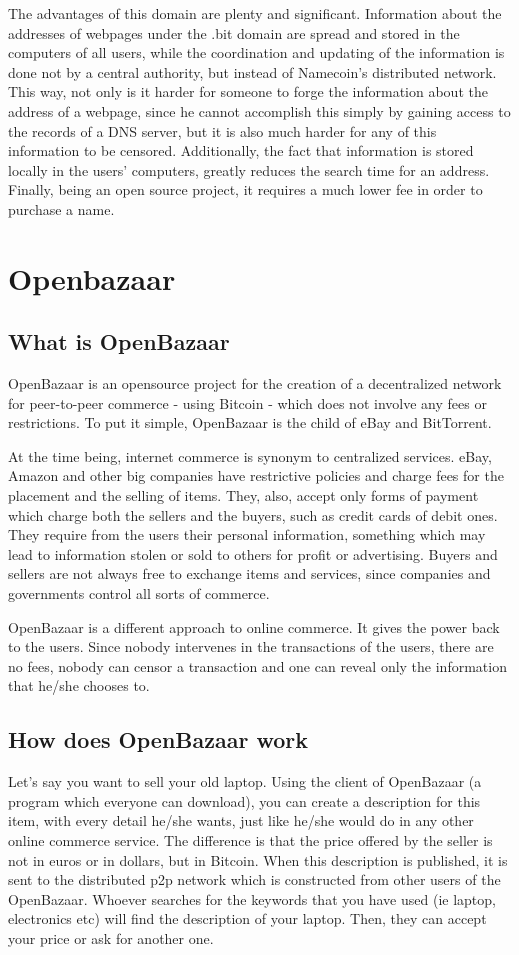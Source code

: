 \documentclass[journal]{IEEEtran}
\begin{document}
The advantages of this domain are plenty and significant. Information about the addresses of
webpages under the .bit domain are spread and stored in the computers of all users,
while the coordination and updating of the information is done not by a central authority,
but instead of Namecoin's distributed network. This way, not only is it harder for someone
to forge the information about the address of a webpage, since he cannot accomplish this
simply by gaining access to the records of a DNS server, but it is also much harder 
for any of this information to be censored. Additionally, the fact that information is
stored locally in the users' computers, greatly reduces the search time for an address.
Finally, being an open source project, it requires a much lower fee in order to purchase
a name.

\section{Openbazaar}
\subsection{What is OpenBazaar}
OpenBazaar is an opensource project for the creation of a decentralized network for peer-to-peer commerce - using Bitcoin - which does not involve any fees or restrictions. To put it simple, OpenBazaar is the child of eBay and BitTorrent. 

At the time being, internet commerce is synonym to centralized services. eBay, Amazon and other big companies have restrictive policies and charge fees for the placement and the selling of items. They, also, accept only forms of payment which charge both the sellers and the buyers, such as credit cards of debit ones. They require from the users their personal information, something which may lead to information stolen or sold to others for profit or advertising. Buyers and sellers are not always free to exchange items and services, since companies and governments control all sorts of commerce.

OpenBazaar is a different approach to online commerce. It gives the power back to the users. Since nobody intervenes in the transactions of the users, there are no fees, nobody can censor a transaction and one can reveal only the information that he/she chooses to.


\subsection{How does OpenBazaar work}
Let's say you want to sell your old laptop. Using the client of OpenBazaar (a program which everyone can download), you can create a description for this item, with every detail he/she wants, just like he/she would do in any other online commerce service. The difference is that the price offered by the seller is not in euros or in dollars, but in Bitcoin. When this description is published, it is sent to the distributed p2p network which is constructed from other users of the OpenBazaar. Whoever searches for the keywords that you have used (ie laptop, electronics etc) will find the description of your laptop. Then, they can accept your price or ask for another one. 
\end{document}
